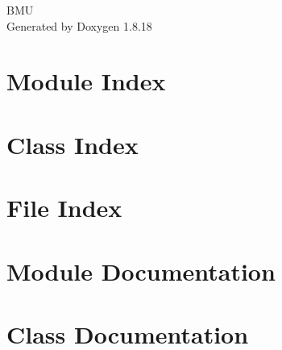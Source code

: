 \let\mypdfximage\pdfximage\def\pdfximage{\immediate\mypdfximage}\documentclass[twoside]{book}
\newcommand{\+}{\discretionary{\mbox{\scriptsize$\hookleftarrow$}}{}{}}
\newcommand{\clearemptydoublepage}{%
  \newpage{\pagestyle{empty}\cleardoublepage}%
}
\begin{document}
\hypersetup{pageanchor=false,
             bookmarksnumbered=true,
             pdfencoding=unicode
            }
\begin{titlepage}
\vspace*{7cm}
\begin{center}%
{\Large B\+MU }\\
\vspace*{1cm}
{\large Generated by Doxygen 1.8.18}\\
\end{center}
\end{titlepage}
\clearemptydoublepage
{}
\tableofcontents
\clearemptydoublepage
{}
\hypersetup{pageanchor=true}

\chapter{Module Index}

\chapter{Class Index}

\chapter{File Index}

\chapter{Module Documentation}

\chapter{Class Documentation}



























\end{document}
